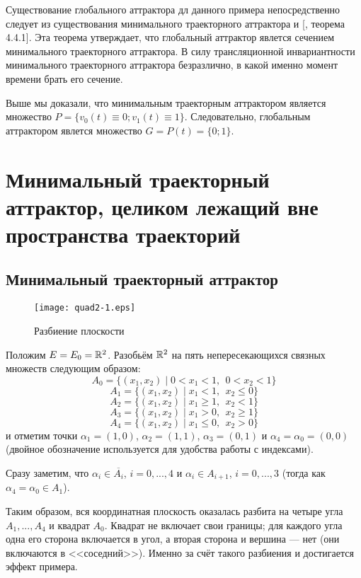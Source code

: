 Существование глобального аттрактора дл данного примера непосредственно следует из существования
минимального траекторного аттрактора и [\cite{Zelenaya}, теорема 4.4.1].
Эта теорема утверждает, что глобальный аттрактор явлется сечением минимального траекторного аттрактора.
В силу трансляционной инвариантности минимального траекторного аттрактора безразлично,
в какой именно момент времени брать его сечение.

Выше мы доказали, что минимальным траекторным аттрактором является множество $P=\{v_0(t)\equiv 0; v_1(t)\equiv 1\}$.
Следовательно, глобальным аттрактором явлется множество $G = P(t) = \{0; 1\}$.

\chapter{Минимальный траекторный аттрактор, целиком лежащий вне пространства траекторий}

\section{Минимальный траекторный аттрактор}

\begin{wrapfigure}[30]{r}{6cm}
	\texttt{[image: quad2-1.eps]}
	\caption{Разбиение плоскости}
	\label{fig:somelabel}
\end{wrapfigure}

Положим $E=E_0=\mathbb{R}^2$.
Разобьём $\mathbb{R}^2$ на пять непересекающихся связных множеств следующим образом:
$$
	A_0 = \{ (x_1, x_2) \mid 0 < x_1 < 1,~~ 0 < x_2 < 1\}
$$
$$
	A_1 = \{ (x_1, x_2) \mid x_1 < 1,~~ x_2 \leq 0  \}
$$
$$
	A_2 = \{ (x_1, x_2) \mid x_1 \geq 1,~~ x_2 < 1  \}
$$
$$
	A_3 = \{ (x_1, x_2) \mid x_1 > 0,~~ x_2 \geq 1  \}
$$
$$
	A_4 = \{ (x_1, x_2) \mid x_1 \leq 0,~~ x_2 > 0  \}
$$
и отметим точки
$\alpha_1=(1, 0)$,
$\alpha_2=(1, 1)$,
$\alpha_3=(0, 1)$ и
$\alpha_4=\alpha_0=(0, 0)$
(двойное обозначение используется для удобства работы с индексами).

Сразу заметим, что $\alpha_i \in \overline{A_i}$, $i=0,...,4$ и
$\alpha_i \in A_{i+1}$, $i=0,...,3$ (тогда как $\alpha_4 = \alpha_0 \in A_{1}$).

Таким образом, вся координатная плоскость оказалась разбита на четыре угла $A_1, ..., A_4$ и квадрат $A_0$.
Квадрат не включает свои границы; для каждого угла одна его сторона включается в угол,
а вторая сторона и вершина --- нет (они включаются в <<соседний>>).
Именно за счёт такого разбиения и достигается эффект примера.

